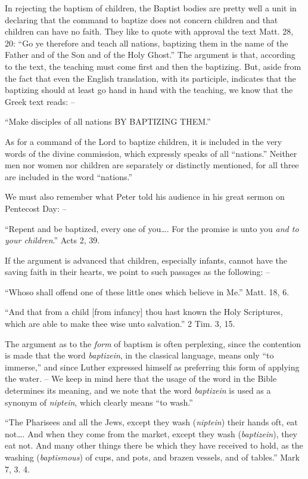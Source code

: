 \documentclass[
]{book}
\begin{document}
In rejecting the baptism of children, the Baptist bodies are pretty well a unit in declaring that the command to baptize does not concern children and that children can have no faith. They like to quote with approval the text Matt. 28, 20: ``Go ye therefore and teach all nations, baptizing them in the name of the Father and of the Son and of the Holy Ghost.'' The argument is that, according to the text, the teaching must come first and then the baptizing. But, aside from the fact that even the English translation, with its participle, indicates that the baptizing should at least go hand in hand with the teaching, we know that the Greek text reads: --

``Make disciples of all nations BY BAPTIZING THEM.''

As for a command of the Lord to baptize children, it is included in the very words of the divine commission, which expressly speaks of all ``nations.'' Neither men nor women nor children are separately or distinctly mentioned, for all three are included in the word ``nations.''

We must also remember what Peter told his audience in his great sermon on Pentecost Day: --

``Repent and be baptized, every one of you\ldots. For the promise is unto you \emph{and to your children}.'' Acts 2, 39.

If the argument is advanced that children, especially infants, cannot have the saving faith in their hearts, we point to such passages as the following: --

``Whoso shall offend one of these little ones which believe in Me.'' Matt. 18, 6.

``And that from a child {[}from infancy{]} thou hast known the Holy Scriptures, which are able to make thee wise unto salvation.'' 2 Tim. 3, 15.

The argument as to the \emph{form} of baptism is often perplexing, since the contention is made that the word \emph{baptizein}, in the classical language, means only ``to immerse,'' and since Luther expressed himself as preferring this form of applying the water. -- We keep in mind here that the usage of the word in the Bible determines its meaning, and we note that the word \emph{baptizein} is used as a synonym of \emph{niptein}, which clearly means ``to wash.''

``The Pharisees and all the Jews, except they wash (\emph{niptein}) their hands oft, eat not\ldots. And when they come from the market, except they wash (\emph{baptizein}), they eat not. And many other things there be which they have received to hold, as the washing (\emph{baptismous}) of cups, and pots, and brazen vessels, and of tables.'' Mark 7, 3. 4.
\end{document}

